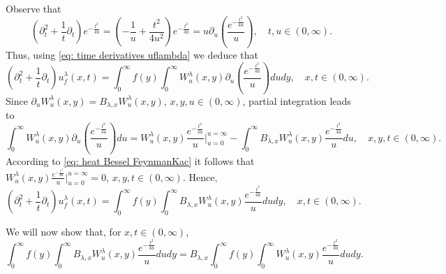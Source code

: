 \documentclass[a4paper,10pt, reqno]{amsart}
\theoremstyle{definition}
\theoremstyle{remark}
\numberwithin{equation}{section}
\begin{document}
Observe that
\[
\left(\partial_t^2+\frac{1}{t}\partial_t\right)e^{-\frac{t^2}{4u}}=\left(-\frac{1}{u}+\frac{t^2}{4u^2}\right)e^{-\frac{t^2}{4u}}=u\partial_u\left(\frac{e^{-\frac{t^2}{4u}}}{u}\right),\quad t,u\in (0,\infty).
\]
Thus, using \eqref{eq: time derivatives uflambda} we deduce that
\[
\left(\partial_t^2+\frac{1}{t}\partial_t\right)u_f^\lambda (x,t)=\int_0^\infty f(y)\int_0^\infty W_u^\lambda(x,y)\partial_u\left(\frac{e^{-\frac{t^2}{4u}}}{u}\right)dudy,\quad x,t\in (0,\infty). 
\]
Since $\partial_uW_u^\lambda (x,y)=B_{\lambda ,x}W_u^\lambda (x,y)$, $x,y,u\in (0,\infty)$, partial integration leads to
\[
\int_0^\infty W_u^\lambda (x,y)\partial_u\left(\frac{e^{-\frac{t^2}{4u}}}{u}\right)du=W_u^\lambda (x,y)\frac{e^{-\frac{t^2}{4u}}}{u}\Bigg|_{u=0}^{u=\infty}-\int_0^\infty B_{\lambda ,x}W_u^\lambda (x,y)\frac{e^{-\frac{t^2}{4u}}}{u}du,\quad x,y,t\in (0,\infty).
\]
According to \eqref{eq: heat Bessel FeynmanKac} it follows that $W_u^\lambda (x,y)\frac{e^{-\frac{t^2}{4u}}}{u}\Bigg|_{u=0}^{u=\infty}=0$, $x,y,t\in (0,\infty)$. Hence,
\[
\left(\partial_t^2+\frac{1}{t}\partial_t\right)u_f^\lambda (x,t)=\int_0^\infty f(y)\int_0^\infty B_{\lambda ,x}W_u^\lambda (x,y)\frac{e^{-\frac{t^2}{4u}}}{u}dudy,\quad x,t\in (0,\infty).
\]

We will now show that, for $x,t\in (0,\infty)$,
\begin{equation}\label{eq: Blambdax exchange}
   \int_0^\infty f(y)\int_0^\infty B_{\lambda ,x}W_u^\lambda (x,y)\frac{e^{-\frac{t^2}{4u}}}{u}dudy=B_{\lambda ,x}\int_0^\infty f(y)\int_0^\infty W_u^\lambda (x,y)\frac{e^{-\frac{t^2}{4u}}}{u}dudy.
\end{equation}
\end{document}
